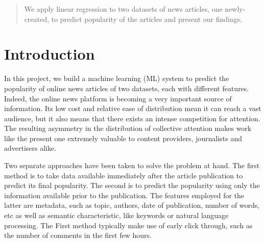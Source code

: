 \documentclass[conference,compsoc]{IEEEtran}
\begin{document}




\maketitle

\begin{abstract}
We apply linear regression to two datasets of news articles, one newly-created, to predict popularity of the articles and present our findings.
\end{abstract}



%
\IEEEpeerreviewmaketitle



\section{Introduction}
In this project, we build a machine learning (ML) system to predict the popularity of online news articles of two datasets, each with different features. Indeed, the online news platform is becoming a very important source of information. Its low cost and relative ease of distribution mean it can reach a vast audience, but it also means that there exists an intense competition for attention. The resulting asymmetry in the distribution of collective attention makes work like the present one extremely valuable to content providers, journalists and advertisers alike.

Two separate approaches have been taken to solve the problem at hand. The first method is to take data available immediately after the article publication to predict its final popularity. The second is to predict the popularity using only the information available prior to the publication. The features employed for the latter are metadata, such as topic, authors, date of publication, number of words, etc as well as semantic characteristic, like keywords or natural language processing. The First method typically make use of early click through, such as the number of comments in the first few hours.
\end{document}
